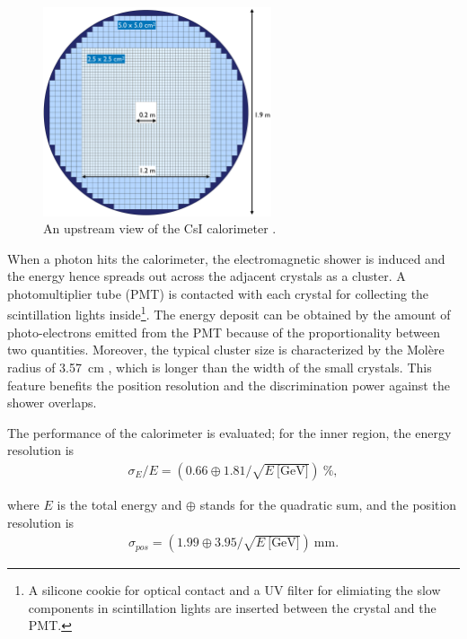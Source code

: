\begin{figure}[h]
\begin{center}
\captionsetup{width=.99\linewidth}
\includegraphics[width=0.6\textwidth]{Figures/Chapter3/CSI_config.pdf}
\caption{An upstream view of the CsI calorimeter \parencite{CSI}.}
\label{fig:CSI_config}
\end{center}
\end{figure}

When a photon hits the calorimeter, the electromagnetic shower is induced and the energy hence spreads out across the adjacent crystals as a cluster. A photomultiplier tube (PMT) is contacted with each crystal for collecting the scintillation lights inside\footnote{A silicone cookie for optical contact \parencite{CSI_cookie} and a UV filter for elimiating the slow components in scintillation lights are inserted between the crystal and the PMT.}. The energy deposit can be obtained by the amount of photo-electrons emitted from the PMT because of the proportionality between two quantities. Moreover, the typical cluster size is characterized by the Mol\`{e}re radius of 3.57~cm \parencite{PDG18}, which is longer than the width of the small crystals. This feature benefits the position resolution and the discrimination power against the shower overlaps.

The performance of the calorimeter is evaluated; for the inner region, the energy resolution is
%
\begin{align}
\sigma_E / E = \left( 0.66 \oplus 1.81 /\sqrt{E~\text{[GeV]}} \right)~\%, 
\end{align}

\noindent
where $E$ is the total energy and $\oplus$ stands for the quadratic sum, and the position resolution is
%
\begin{align}
\sigma_{pos} = \left( 1.99 \oplus 3.95 /\sqrt{E~\text{[GeV]}} \right)~\text{mm}.
\end{align}


